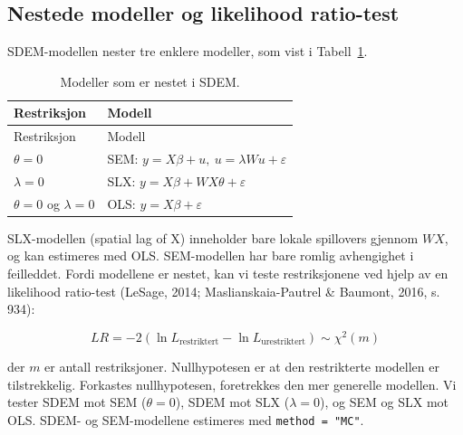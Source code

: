 \documentclass[
  norsk,
  a4paper,
]{article}
\begin{document}
\subsection{Nestede modeller og likelihood
ratio-test}\label{nestede-modeller-og-likelihood-ratio-test}

SDEM-modellen nester tre enklere modeller, som vist i
Tabell~\ref{tbl-nesting}.

\begin{longtable}[]{@{}
  >{\raggedright\arraybackslash}p{}
  >{\raggedright\arraybackslash}p{}@{}}
\caption{Modeller som er nestet i
SDEM.}\label{tbl-nesting}\tabularnewline
\toprule\noalign{}
\begin{minipage}[b]{\linewidth}\raggedright
Restriksjon
\end{minipage} & \begin{minipage}[b]{\linewidth}\raggedright
Modell
\end{minipage} \\
\midrule\noalign{}
\endfirsthead
\toprule\noalign{}
\begin{minipage}[b]{\linewidth}\raggedright
Restriksjon
\end{minipage} & \begin{minipage}[b]{\linewidth}\raggedright
Modell
\end{minipage} \\
\midrule\noalign{}
\endhead
\bottomrule\noalign{}
\endlastfoot
\(\theta = 0\) & SEM:
\(y = X\beta + u, \ u = \lambda W u + \varepsilon\) \\
\(\lambda = 0\) & SLX: \(y = X\beta + WX\theta + \varepsilon\) \\
\(\theta = 0\) og \(\lambda = 0\) & OLS: \(y = X\beta + \varepsilon\) \\
\end{longtable}

SLX-modellen (spatial lag of X) inneholder bare lokale spillovers
gjennom \(WX\), og kan estimeres med OLS. SEM-modellen har bare romlig
avhengighet i feilleddet. Fordi modellene er nestet, kan vi teste
restriksjonene ved hjelp av en likelihood ratio-test (LeSage, 2014;
Maslianskaia-Pautrel \& Baumont, 2016, s. 934):

\[LR = -2 \left( \ln L_{\text{restriktert}} - \ln L_{\text{urestriktert}} \right) \sim \chi^2(m)\]

der \(m\) er antall restriksjoner. Nullhypotesen er at den restrikterte
modellen er tilstrekkelig. Forkastes nullhypotesen, foretrekkes den mer
generelle modellen. Vi tester SDEM mot SEM (\(\theta = 0\)), SDEM mot
SLX (\(\lambda = 0\)), og SEM og SLX mot OLS. SDEM- og SEM-modellene
estimeres med \texttt{method\ =\ "MC"}.
\end{document}

